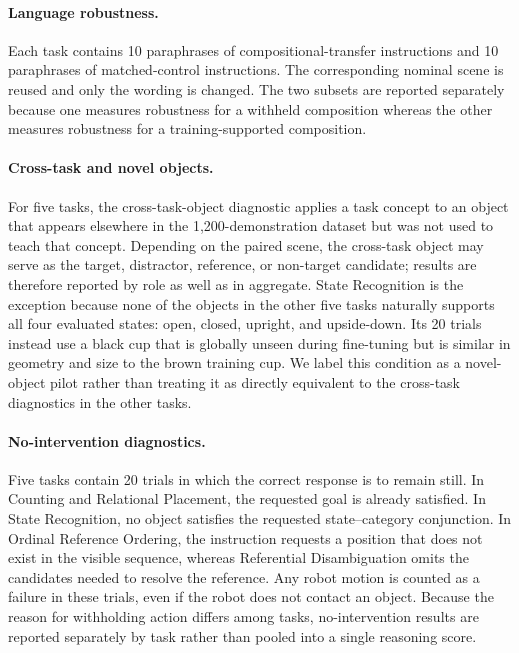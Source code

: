 \paragraph{Language robustness.}
Each task contains 10 paraphrases of compositional-transfer instructions and 10 paraphrases of matched-control instructions. The corresponding nominal scene is reused and only the wording is changed. The two subsets are reported separately because one measures robustness for a withheld composition whereas the other measures robustness for a training-supported composition.

\paragraph{Cross-task and novel objects.}
For five tasks, the cross-task-object diagnostic applies a task concept to an object that appears elsewhere in the 1,200-demonstration dataset but was not used to teach that concept. Depending on the paired scene, the cross-task object may serve as the target, distractor, reference, or non-target candidate; results are therefore reported by role as well as in aggregate. State Recognition is the exception because none of the objects in the other five tasks naturally supports all four evaluated states: open, closed, upright, and upside-down. Its 20 trials instead use a black cup that is globally unseen during fine-tuning but is similar in geometry and size to the brown training cup. We label this condition as a novel-object pilot rather than treating it as directly equivalent to the cross-task diagnostics in the other tasks.

\paragraph{No-intervention diagnostics.}
Five tasks contain 20 trials in which the correct response is to remain still. In Counting and Relational Placement, the requested goal is already satisfied. In State Recognition, no object satisfies the requested state--category conjunction. In Ordinal Reference Ordering, the instruction requests a position that does not exist in the visible sequence, whereas Referential Disambiguation omits the candidates needed to resolve the reference. Any robot motion is counted as a failure in these trials, even if the robot does not contact an object. Because the reason for withholding action differs among tasks, no-intervention results are reported separately by task rather than pooled into a single reasoning score.

